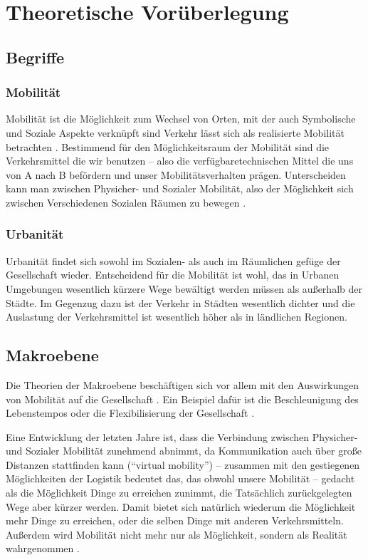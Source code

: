 
\section{Theoretische Vorüberlegung}

\subsection{Begriffe}
\subsubsection*{Mobilität}

Mobilität ist die Möglichkeit zum Wechsel von Orten, mit der auch Symbolische und Soziale Aspekte verknüpft sind Verkehr lässt sich als realisierte Mobilität betrachten \parencite[6]{fh7}.
Bestimmend für den Möglichkeitsraum der Mobilität sind die Verkehrsmittel die wir benutzen – also die verfügbaretechnischen Mittel die uns von A nach B befördern und unser Mobilitätsverhalten prägen.
Unterscheiden kann man zwischen Physicher- und Sozialer Mobilität, also der Möglichkeit sich zwischen Verschiedenen Sozialen Räumen zu bewegen \parencite[67 f.]{schulz}.

\subsubsection*{Urbanität}
Urbanität findet sich sowohl im Sozialen- als auch im Räumlichen gefüge der Gesellschaft wieder.
Entscheidend für die Mobilität ist wohl, das in Urbanen Umgebungen wesentlich kürzere Wege bewältigt werden müssen als außerhalb der Städte.
Im Gegenzug dazu ist der Verkehr in Städten wesentlich dichter und die Auslastung der Verkehrsmittel ist wesentlich höher als in ländlichen Regionen.

\subsection{Makroebene}
Die Theorien der Makroebene beschäftigen sich vor allem mit den Auswirkungen von Mobilität auf die Gesellschaft \parencite[6 ff.]{widmer}.
Ein Beispiel dafür ist die Beschleunigung des Lebenstempos \parencite{rosa,rosa1} oder die Flexibilisierung der Gesellschaft \parencite{sennett}.

Eine Entwicklung der letzten Jahre ist, dass die Verbindung zwischen Physicher- und Sozialer Mobilität zunehmend abnimmt, da Kommunikation auch über große Distanzen stattfinden kann (\enquote{virtual mobility}) – zusammen mit den gestiegenen Möglichkeiten der Logistik bedeutet das, das obwohl unsere Mobilität – gedacht als die Möglichkeit Dinge zu erreichen zunimmt, die Tatsächlich zurückgelegten Wege aber kürzer werden.
Damit bietet sich natürlich wiederum die Möglichkeit mehr Dinge zu erreichen, oder die selben Dinge mit anderen Verkehrsmitteln.
Außerdem wird Mobilität nicht mehr nur als Möglichkeit, sondern als Realität wahrgenommen \parencite[17 f.]{widmer}.

